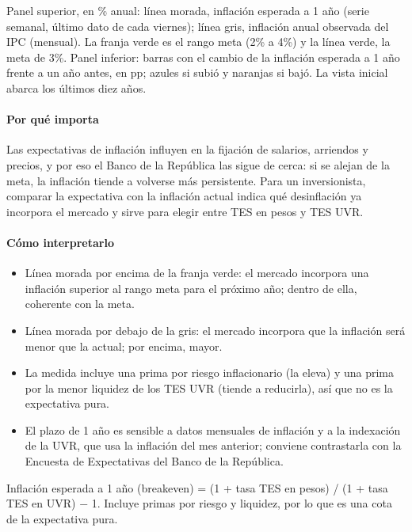 \begin{leer}
Panel superior, en \% anual: línea morada, inflación esperada a 1 año (serie semanal, último dato de cada viernes); línea gris, inflación anual observada del IPC (mensual). La franja verde es el rango meta (2\% a 4\%) y la línea verde, la meta de 3\%. Panel inferior: barras con el cambio de la inflación esperada a 1 año frente a un año antes, en pp; azules si subió y naranjas si bajó. La vista inicial abarca los últimos diez años.
\end{leer}

\paragraph{Por qué importa}
Las expectativas de inflación influyen en la fijación de salarios, arriendos y precios, y por eso el Banco de la República las sigue de cerca: si se alejan de la meta, la inflación tiende a volverse más persistente. Para un inversionista, comparar la expectativa con la inflación actual indica qué desinflación ya incorpora el mercado y sirve para elegir entre TES en pesos y TES UVR.

\paragraph{Cómo interpretarlo}
\begin{itemize}
\item Línea morada por encima de la franja verde: el mercado incorpora una inflación superior al rango meta para el próximo año; dentro de ella, coherente con la meta.
\item Línea morada por debajo de la gris: el mercado incorpora que la inflación será menor que la actual; por encima, mayor.
\item La medida incluye una prima por riesgo inflacionario (la eleva) y una prima por la menor liquidez de los TES UVR (tiende a reducirla), así que no es la expectativa pura.
\item El plazo de 1 año es sensible a datos mensuales de inflación y a la indexación de la UVR, que usa la inflación del mes anterior; conviene contrastarla con la Encuesta de Expectativas del Banco de la República.
\end{itemize}
\begin{formulas}[Fórmulas]
\end{formulas}
\begin{metodo}[Metodología]
Inflación esperada a 1 año (breakeven) = (1 + tasa TES en pesos) / (1 + tasa TES en UVR) − 1. Incluye primas por riesgo y liquidez, por lo que es una cota de la expectativa pura.
\par{}
\end{metodo}

